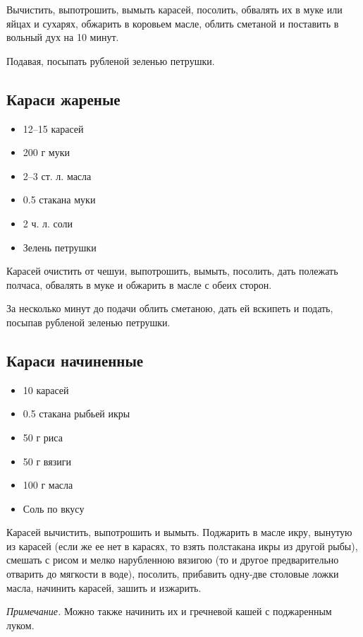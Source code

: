 Вычистить, выпотрошить, вымыть карасей, посолить, обвалять их в муке или яйцах и сухарях, обжарить в коровьем масле, облить сметаной и поставить в вольный дух на 10 минут.

Подавая, посыпать рубленой зеленью петрушки.

\subsection{Караси жареные}

\begin{itemize} 
	\item  12–15 карасей 
    \item  200 г муки 
    \item  2–3 ст. л. масла 
    \item  0.5 стакана муки 
    \item  2 ч. л. соли 
    \item  Зелень петрушки
\end{itemize}

Карасей очистить от чешуи, выпотрошить, вымыть, посолить, дать полежать полчаса, обвалять в муке и обжарить в масле с обеих сторон.

За несколько минут до подачи облить сметаною, дать ей вскипеть и подать, посыпав рубленой зеленью петрушки.

\subsection{Караси начиненные}

\begin{itemize} 
	\item  10 карасей 
    \item  0.5 стакана рыбьей икры 
    \item  50 г риса 
    \item  50 г вязиги 
    \item  100 г масла 
    \item  Соль по вкусу
\end{itemize}

Карасей вычистить, выпотрошить и вымыть. Поджарить в масле икру, вынутую из карасей (если же ее нет в карасях, то взять полстакана икры из другой рыбы), смешать с рисом и мелко нарубленною вязигою (то и другое предварительно отварить до мягкости в воде), посолить, прибавить одну-две столовые ложки масла, начинить карасей, зашить и изжарить.

\emph{Примечание.} Можно также начинить их и гречневой кашей с поджаренным луком.

